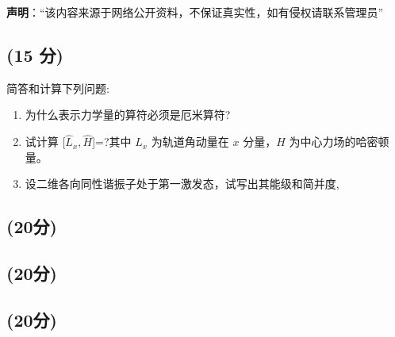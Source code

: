 
\textbf{声明}：“该内容来源于网络公开资料，不保证真实性，如有侵权请联系管理员”

\subsection{(15 分)}
简答和计算下列问题:
\begin{enumerate}
    \item 为什么表示力学量的算符必须是厄米算符?
    \item 试计算 [$\hat{L}_x ,\hat{H}$]=?其中 $\hat{L}_x$ 为轨道角动量在 $x$ 分量，$\hat{H}$ 为中心力场的哈密顿量。
    \item 设二维各向同性谐振子处于第一激发态，试写出其能级和简并度,
\end{enumerate}

\subsection{(20分)}

\subsection{(20分)}

\subsection{(20分)}

